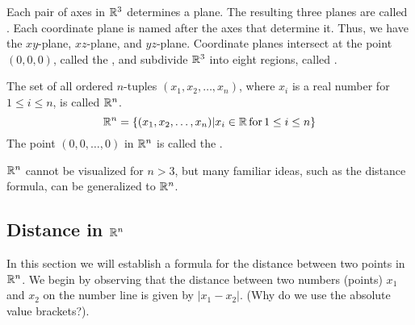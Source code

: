 \documentclass{ximera}
\begin{document}
Each pair of axes in $\mathbb{R}^3$ determines a plane. The resulting three planes are called .  Each coordinate plane is named after the axes that determine it.  Thus, we have the $xy$-plane, $xz$-plane, and $yz$-plane.  Coordinate planes intersect at the point $(0, 0, 0)$, called the , and subdivide $\mathbb{R}^3$ into eight regions, called . 

\begin{center}
\end{center}



The set of all ordered $n$-tuples $(x_1, x_2, \ldots, x_n)$, where $x_i$ is a real number for $1\leq i\leq n$, is called $\mathbb{R}^n$.
$$\mathbb{R}^n=\{(x_1, x_2,\ldots,x_n)|x_i\in \mathbb{R}\, \text{for}\, 1\leq i\leq n\}$$
The point $(0,0,\ldots, 0)$ in $\mathbb{R}^n$ is called the . 

$\mathbb{R}^n$ cannot be visualized for $n>3$, but many familiar ideas, such as the distance formula, can be generalized to $\mathbb{R}^n$. 

\subsection*{Distance in $\mathbb{R}^n$}
In this section we will establish a formula for the distance between two points in $\mathbb{R}^n$.  We begin by observing that the distance between two numbers (points) $x_1$ and $x_2$ on the number line is given by $|x_1-x_2|$.  (Why do we use the absolute value brackets?).
\end{document}
